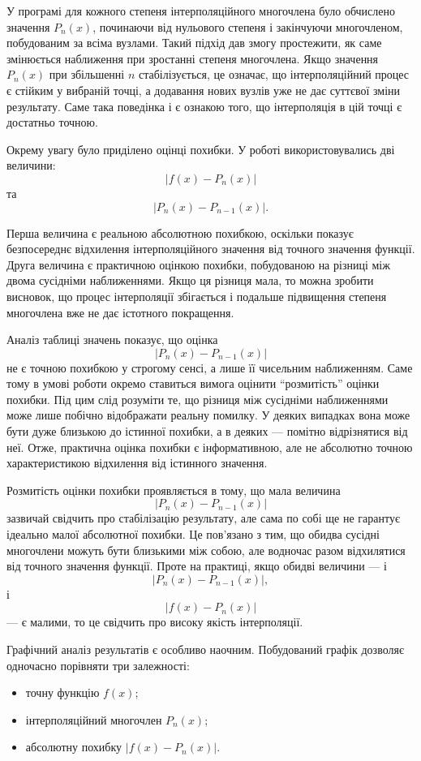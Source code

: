 \documentclass[12pt,a4paper]{article}
\begin{document}
    У програмі для кожного степеня інтерполяційного многочлена було обчислено значення $P_n(x)$, починаючи від нульового степеня і закінчуючи многочленом, побудованим за всіма вузлами. Такий підхід дав змогу простежити, як саме змінюється наближення при зростанні степеня многочлена. Якщо значення $P_n(x)$ при збільшенні $n$ стабілізується, це означає, що інтерполяційний процес є стійким у вибраній точці, а додавання нових вузлів уже не дає суттєвої зміни результату. Саме така поведінка і є ознакою того, що інтерполяція в цій точці є достатньо точною.

    Окрему увагу було приділено оцінці похибки. У роботі використовувались дві величини:
    $$
    |f(x)-P_n(x)|
    $$
    та
    $$
    |P_n(x)-P_{n-1}(x)|.
    $$

    Перша величина є реальною абсолютною похибкою, оскільки показує безпосереднє відхилення інтерполяційного значення від точного значення функції. Друга величина є практичною оцінкою похибки, побудованою на різниці між двома сусідніми наближеннями. Якщо ця різниця мала, то можна зробити висновок, що процес інтерполяції збігається і подальше підвищення степеня многочлена вже не дає істотного покращення.

    Аналіз таблиці значень показує, що оцінка
    $$
    |P_n(x)-P_{n-1}(x)|
    $$
    не є точною похибкою у строгому сенсі, а лише її чисельним наближенням. Саме тому в умові роботи окремо ставиться вимога оцінити ``розмитість'' оцінки похибки. Під цим слід розуміти те, що різниця між сусідніми наближеннями може лише побічно відображати реальну помилку. У деяких випадках вона може бути дуже близькою до істинної похибки, а в деяких --- помітно відрізнятися від неї. Отже, практична оцінка похибки є інформативною, але не абсолютно точною характеристикою відхилення від істинного значення.

    Розмитість оцінки похибки проявляється в тому, що мала величина
    $$
    |P_n(x)-P_{n-1}(x)|
    $$
    зазвичай свідчить про стабілізацію результату, але сама по собі ще не гарантує ідеально малої абсолютної похибки. Це пов'язано з тим, що обидва сусідні многочлени можуть бути близькими між собою, але водночас разом відхилятися від точного значення функції. Проте на практиці, якщо обидві величини --- і
    $$
    |P_n(x)-P_{n-1}(x)|,
    $$
    і
    $$
    |f(x)-P_n(x)|
    $$
    --- є малими, то це свідчить про високу якість інтерполяції.

    Графічний аналіз результатів є особливо наочним. Побудований графік дозволяє одночасно порівняти три залежності:
    \begin{itemize}
        \item точну функцію $f(x)$;
        \item інтерполяційний многочлен $P_n(x)$;
        \item абсолютну похибку $|f(x)-P_n(x)|$.
    \end{itemize}
\end{document}

